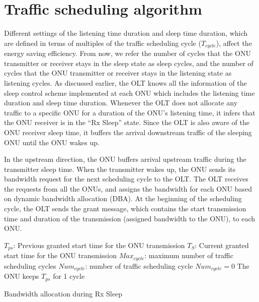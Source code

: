 \documentclass[11pt,english,12pt,onecolumn, draftcls]{IEEEtran}
\theoremstyle{plain}
\theoremstyle{definition}
\begin{document}
\section{Traffic scheduling algorithm}
\label{sec:Schedul}
Different settings of the listening time duration and sleep time duration, which are defined in terms of multiples of the traffic scheduling cycle ($T_{cycle}$), affect the energy saving efficiency. From now, we refer the number of cycles that the ONU transmitter or receiver stays in the sleep state as sleep cycles, and the number of cycles that the ONU transmitter or receiver stays in the listening state as listening cycles. As discussed earlier, the OLT knows all the information of the sleep control scheme implemented at each ONU which includes the listening time duration and sleep time duration. Whenever the OLT does not allocate any traffic to a specific ONU for a duration of the ONU's listening time, it infers that the ONU receiver is in the ``Rx Sleep'' state. Since the OLT is also aware of the ONU receiver sleep time, it buffers the arrival downstream traffic of the sleeping ONU until the ONU wakes up.

In the upstream direction, the ONU buffers arrival upstream traffic during the transmitter sleep time. When the transmitter wakes up, the ONU sends its bandwidth request for the next scheduling cycle to the OLT. The OLT receives the requests from all the ONUs, and assigns the bandwidth for each ONU based on dynamic bandwidth allocation (DBA). At the beginning of the scheduling cycle, the OLT sends the grant message, which contains the start transmission time and duration of the transmission (assigned bandwidth to the ONU), to each ONU.

\begin{algorithm}

$T_{ps}$: Previous granted start time for the ONU transmission\;
 $T_S$: Current granted start time for the ONU transmission\;
 $Max_{cycle}$: maximum number of traffic scheduling cycles\;
 $Num_{cycle}$: number of traffic scheduling cycle\;
 $Num_{cycle}=0$\;
 The ONU keeps $T_{ps}$ for 1 cycle\;
 \caption{Bandwidth allocation during Rx Sleep}

 \label{alg:BW}
\end{algorithm}
\end{document}
